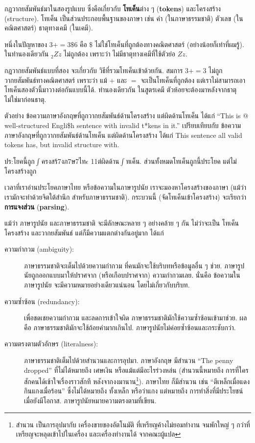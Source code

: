 กฎวากยสัมพันธ์มาในสองรูปแบบ ซึ่งคือเกี่ยวกับ \textbf{โทเค็น}ต่าง ๆ (\textbf{tokens}) และโครงสร้าง (structure).
โทเค็น เป็นส่วนประกอบพื้นฐานของภาษา
เช่น คำ (ในภาษาธรรมชาติ) ตัวเลข (ในคณิตศาสตร์) ธาตุทางเคมี (ในเคมี).

หนึ่งในปัญหาของ
$3 += 3 \$ 6$ คือ
\( \$ \) ไม่ใช่โทเค็นที่ถูกต้องทางคณิตศาสตร์ (อย่างน้อยก็เท่าที่ผมรู้).
ในทำนองเดียวกัน $_2Zz$ ไม่ถูกต้อง 
เพราะว่า
ไม่มีธาตุทางเคมีที่ใช้ตัวย่อ $Zz$.

กฎวากยสัมพันธ์แบบที่สอง จะเกี่ยวกับ วิธีที่รวมโทเค็นเข้าด้วยกัน.
สมการ $3 += 3$ ไม่ถูกวากยสัมพันธ์ทางคณิตศาสตร์
เพราะว่า แม้ $+$ และ $=$ จะเป็นโทเค็นที่ถูกต้อง
แต่เราไม่สามารถเอาโทเค็นสองตัวนี้มาวางต่อกันแบบนี้ได้.
ทำนองเดียวกัน ในสูตรเคมี ตัวห้อยจะต้องมาหลังจากธาตุ ไม่ใช่มาก่อนธาตุ.

ตัวอย่าง ข้อความภาษาอังกฤษที่ถูกวากยสัมพันธ์ด้านโครงสร้าง 
แต่ผิดด้านโทเค็น ได้แก่
``This is @ well-structured Engli\$h
sentence with invalid t*kens in it.'' \;  
เปรียบเทียบกับ ข้อความภาษาอังกฤษที่ถูกวากยสัมพันธ์ด้านโทเค็น
แต่ผิดด้านโครงสร้าง ได้แก่
This sentence all valid tokens
has, but invalid structure with.

ปร:โยคนี้ถูก$\int$ครงสร้7งภ7ษ7ไท$\epsilon$ 11ต่ผิดด้าน$\int$ทเค็น.
ส่วนทั้งหมดโทเค็นถูกนี้ประโยค แต่ไม่โครงสร้างถูก

เวลาที่เราอ่านประโยคภาษาไทย 
หรือข้อความในภาษารูปนัย
เราจะมองหาโครงสร้างของภาษา (แม้ว่า เรามักจะทำด้วยจิตใต้สำนึก สำหรับภาษาธรรมชาติ).
กระบวนนี้ (จัดโทเค็นเข้าโครงสร้าง) จะเรียกว่า \textbf{การแจงส่วน} (\textbf{parsing}).

แม้ว่า ภาษารูปนัย และภาษาธรรมชาติ จะมีลักษณะหลาย ๆ อย่างคล้าย ๆ กัน ไม่ว่าจะเป็น โทเค็น โครงสร้าง และวากยสัมพันธ์
แต่ก็มีความแตกต่างกันอยู่มาก ได้แก่

\begin{description}

\item[ความกำกวม (ambiguity):] 
ภาษาธรรมชาติจะเต็มไปด้วยความกำกวม
ที่คนมักจะใช้บริบทหรือข้อมูลอื่น ๆ ช่วย.
ภาษารูปนัยถูกออกแบบมาให้ปราศจาก (หรือเกือบปราศจาก) ความกำกวมเลย.
นั่นคือ ข้อความในภาษารูปนัย จะมีความหมายอย่างเดียวแน่นอน โดยไม่เกี่ยวกับบริบท.

\item[ความซ้ำซ้อน (redundancy):] 
เพื่อชดเชยความกำกวม และลดการเข้าใจผิด
ภาษาธรรมชาติมักใช้ความซ้ำซ้อนเข้ามาช่วย.
ผลคือ ภาษาธรรมชาติมักจะใช้ถ้อยคำมากเกินไป.  
ภาษารูปนัยไม่ค่อยซ้ำซ้อนและกระชับกว่า.

\item[ความตรงตามตัวอักษร (literalness):] 
ภาษาธรรมชาติเต็มไปด้วยสำนวนและการอุปมา.
ภาษาอังกฤษ มีสำนวน ``The penny dropped'' ที่ไม่ได้หมายถึง เศษเงิน หรือแม้แต่มีอะไรร่วงหล่น 
(สำนวนนี้หมายถึง การที่ใครสักคนได้เข้าใจเรื่องราวสักที หลังจากงงมานาน\footnote{
สำนวน เป็นการอุปมากับ เครื่องขายของอัตโนมัติ ที่เหรียญค้างไม่ยอมทำงาน
จนพักใหญ่ ๆ กว่าที่เหรียญจะหลุดเข้าไปในเครื่อง และเครื่องทำงานได้
จากคณะผู้แปล
}).  
ภาษาไทย ก็มีสำนวน เช่น
``ตีเหล็กเมื่อแดง กินแกงเมื่อร้อน''
ซึ่งไม่ได้หมายถึง ทั้งเหล็ก หรือว่าแกง แต่หมายถึง
การทำสิ่งที่มีประโยชน์ เมื่อยังมีโอกาส.
ภาษารูปนัยหมายความตรงตามที่เขียน.

\end{description}

